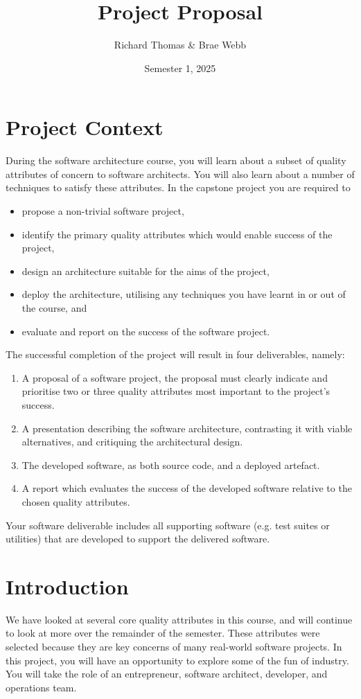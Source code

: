 \documentclass{csse4400}
\title{Project Proposal}
\author{Richard Thomas \& Brae Webb}
\date{Semester 1, 2025}
\begin{document}

\maketitle

\section*{Project Context}
During the software architecture course,
you will learn about a subset of quality attributes of concern to software architects.
You will also learn about a number of techniques to satisfy these attributes.
In the capstone project you are required to
\begin{itemize}
    \item propose a non-trivial software project,
    \item identify the primary quality attributes which would enable success of the project,
    \item design an architecture suitable for the aims of the project,
    \item deploy the architecture, utilising any techniques you have learnt in or out of the course, and
    \item evaluate and report on the success of the software project.
\end{itemize}

\noindent
The successful completion of the project will result in four deliverables, namely:
\begin{enumerate}[label=\roman*]
    \item A proposal of a software project, the proposal must clearly indicate and prioritise two or three quality attributes most important to the project's success.
    \item A presentation describing the software architecture, contrasting it with viable alternatives, and critiquing the architectural design.
    \item The developed software, as both source code, and a deployed artefact.
    \item A report which evaluates the success of the developed software relative to the chosen quality attributes.
\end{enumerate}

\noindent
Your software deliverable includes all supporting software (e.g. test suites or utilities) that are developed to support the delivered software.

\section{Introduction}
We have looked at several core quality attributes in this course, and will continue to look at more over the remainder of the semester.
These attributes were selected because they are key concerns of many real-world software projects.
In this project, you will have an opportunity to explore some of the fun of industry.
You will take the role of an entrepreneur, software architect, developer, and operations team.
\end{document}
